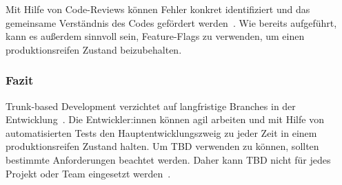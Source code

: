 Mit Hilfe von Code\hyp Reviews können Fehler konkret identifiziert und das gemeinsame Verständnis des Codes gefördert werden~\cite{trunkbased_bestpractice1}. Wie bereits aufgeführt, kann es außerdem sinnvoll sein, Feature\hyp Flags zu verwenden, um einen produktionsreifen Zustand beizubehalten.

\subsubsection{Fazit}

Trunk\hyp based Development verzichtet auf langfristige Branches in der Entwicklung~\cite{trunkbased6}. Die Entwickler:innen können agil arbeiten und mit Hilfe von automatisierten Tests den Hauptentwicklungszweig zu jeder Zeit in einem produktionsreifen Zustand halten. Um TBD verwenden zu können, sollten bestimmte Anforderungen beachtet werden. Daher kann TBD nicht für jedes Projekt oder Team eingesetzt werden~\cite{Manturewicz_trunk-based_2023}.
